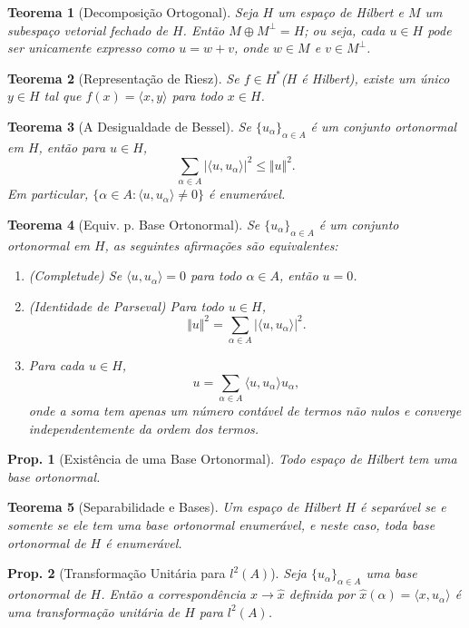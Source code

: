 \documentclass[11pt]{article}
\theoremstyle{yellowhead}
\newtheorem*{theorem}{Teorema}
\newtheorem*{proposition}{Prop.}
\theoremstyle{yellowdef}
\begin{document}
\begin{multicols}{3}
\begin{theorem}[Decomposição Ortogonal]
Seja $H$ um espaço de Hilbert e $M$ um subespaço vetorial fechado de $H$. Então $M \oplus M^\perp = H$; ou seja, cada $u \in H$ pode ser unicamente expresso como $u = w + v$, onde $w \in M$ e $v \in M^\perp$.
\end{theorem}

\begin{theorem}[Representação de Riesz]
Se $f \in H^*$(\emph{$H$ é Hilbert}), existe um único $y \in H$ tal que $f(x) = \langle x, y \rangle$ para todo $x \in H$.
\end{theorem}

\begin{theorem}[A Desigualdade de Bessel]
Se $\{u_\alpha\}_{\alpha \in A}$ é um conjunto ortonormal em $H$, então para $u \in H$,
\[
\sum_{\alpha \in A} |\langle u, u_\alpha \rangle|^2 \le \Vert u \Vert^2.
\]
Em particular, $\{\alpha \in A : \langle u, u_\alpha \rangle \neq 0\}$ é enumerável.
\end{theorem}

\begin{theorem}[Equiv. p. Base Ortonormal]
Se $\{u_\alpha\}_{\alpha \in A}$ é um conjunto ortonormal em $H$, as seguintes afirmações são equivalentes:
\begin{enumerate}[label=(\alph*)]
    \item (Completude) Se $\langle u, u_\alpha \rangle = 0$ para todo $\alpha \in A$, então $u = 0$.
    \item (Identidade de Parseval) Para todo $u \in H$,
    \[
    \Vert u \Vert^2 = \sum_{\alpha \in A} |\langle u, u_\alpha \rangle|^2.
    \]
    \item Para cada $u \in H$,
    \[
    u = \sum_{\alpha \in A} \langle u, u_\alpha \rangle u_\alpha,
    \]
    onde a soma tem apenas um número contável de termos não nulos e converge independentemente da ordem dos termos.
\end{enumerate}
\end{theorem}

\begin{proposition}[Existência de uma Base Ortonormal]
Todo espaço de Hilbert tem uma base ortonormal.
\end{proposition}

\begin{theorem}[Separabilidade e Bases]
Um espaço de Hilbert $H$ é separável se e somente se ele tem uma base ortonormal enumerável, e neste caso, toda base ortonormal de $H$ é enumerável.
\end{theorem}

\begin{proposition}[Transformação Unitária para $l^2(A)$]
Seja $\{u_\alpha\}_{\alpha \in A}$ uma base ortonormal de $H$. Então a correspondência $x \to \hat{x}$ definida por $\hat{x}(\alpha) = \langle x, u_\alpha \rangle$ é uma transformação unitária de $H$ para $l^2(A)$.
\end{proposition}
\end{multicols}
\end{document}
